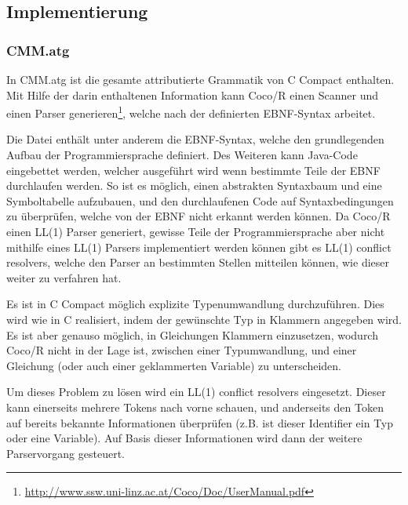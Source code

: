

\subsection{Implementierung}

\subsubsection{CMM.atg}

In CMM.atg ist die gesamte attributierte Grammatik von C Compact enthalten. Mit Hilfe der darin enthaltenen Information kann Coco/R einen Scanner und einen Parser generieren\footnote{\url{http://www.ssw.uni-linz.ac.at/Coco/Doc/UserManual.pdf}}, welche nach der definierten EBNF-Syntax arbeitet.

Die Datei enth\"alt unter anderem die EBNF-Syntax, welche den grundlegenden Aufbau der Programmiersprache definiert. Des Weiteren kann Java-Code eingebettet werden, welcher ausgef\"uhrt wird wenn bestimmte Teile der EBNF durchlaufen werden. So ist es m\"oglich, einen abstrakten Syntaxbaum und eine Symboltabelle aufzubauen, und den durchlaufenen Code auf Syntaxbedingungen zu \"uberpr\"ufen, welche von der EBNF nicht erkannt werden k\"onnen. Da Coco/R einen LL(1) Parser generiert, gewisse Teile der Programmiersprache aber nicht mithilfe eines LL(1) Parsers implementiert werden k\"onnen gibt es LL(1) conflict resolvers, welche den Parser an bestimmten Stellen mitteilen k\"onnen, wie dieser weiter zu verfahren hat.


Es ist in C Compact m\"oglich explizite Typenumwandlung durchzuf\"uhren. Dies wird wie in C realisiert, indem der gew\"unschte Typ in Klammern angegeben wird. Es ist aber genauso m\"oglich, in Gleichungen Klammern einzusetzen, wodurch Coco/R nicht in der Lage ist, zwischen einer Typumwandlung, und einer Gleichung (oder auch einer geklammerten Variable) zu unterscheiden.

Um dieses Problem zu l\"osen wird ein LL(1) conflict resolvers eingesetzt. Dieser kann einerseits mehrere Tokens nach vorne schauen, und anderseits den Token auf bereits bekannte Informationen \"uberpr\"ufen (z.B. ist dieser Identifier ein Typ oder eine Variable). Auf Basis dieser Informationen wird dann der weitere Parservorgang gesteuert.

